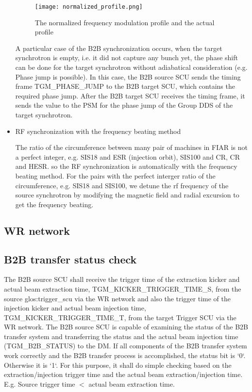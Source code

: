 \begin{itemize}
\begin{figure}[!htb]
   \centering   
   \texttt{[image: normalized\_profile.png]}
   \caption{The normalized frequency modulation profile and the actual profile}
   \label{normalized_profile}
\end{figure}  

A particular case of the B2B synchronization occurs, when the target synchrotron is empty, i.e. it did not capture any bunch yet, the phase shift can be done for the target synchrotron without adiabatical consideration (e.g. Phase jump is possible). In this case, the B2B source SCU sends the timing frame TGM\_PHASE\_JUMP to the B2B target SCU, which contains the required phase jump. After the B2B target SCU receives the timing frame, it sends the value to the PSM for the phase jump of the Group DDS of the target synchrotron. 

\item RF synchronization with the frequency beating method

The ratio of the circumference between many pair of machines in FIAR is not a perfect integer, e.g. SIS18 and ESR (injection orbit), SIS100 and CR, CR and HESR. so the RF synchronization is automatically with the frequency beating method. For the pairs with the perfect interger ratio of the circumference, e.g. SIS18 and SIS100, we detune the rf frequency of the source synchrotron by modifying the magnetic field and radial excursion to get the frequency beating.

\end{itemize}
\subsection{WR network}
\subsection{B2B transfer status check}
The B2B source SCU shall receive the trigger time of the extraction kicker and actual beam extraction time, TGM\_KICKER\_TRIGGER\_TIME\_S, from the source \gls{glos:trigger_scu} via the WR network and also the trigger time of the injection kicker and actual beam injection time, TGM\_KICKER\_TRIGGER\_TIME\_T, from the target Trigger SCU via the WR network. The B2B source SCU is capable of examining the status of the B2B transfer system and transferring the status and the actual beam injection time  (TGM\_B2B\_STATUS) to the DM. If all components of the B2B transfer system work correctly and the B2B transfer process is accomplished, the status bit is `0`. Otherwise it is `1`. For this purpose, it shall do simple checking based on the extraction/injection trigger time and the actual beam extraction/injection time. E.g. Source trigger time $<$ actual beam extraction time.


